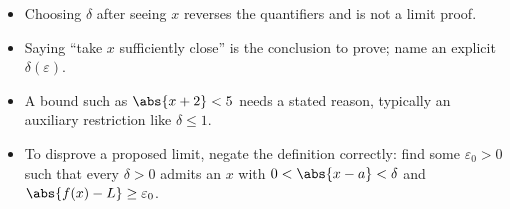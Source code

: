\begin{remark}
\begin{itemize}
  \item Choosing $\delta$ after seeing $x$ reverses the quantifiers and is
  not a limit proof.
  \item Saying ``take $x$ sufficiently close'' is the conclusion to prove;
  name an explicit $\delta(\varepsilon)$.
  \item A bound such as $\abs{x+2}<5$ needs a stated reason, typically an
  auxiliary restriction like $\delta\leq1$.
  \item To disprove a proposed limit, negate the definition correctly:
  find some $\varepsilon_0>0$ such that every $\delta>0$ admits an $x$ with
  $0<\abs{x-a}<\delta$ and $\abs{f(x)-L}\geq\varepsilon_0$.
\end{itemize}
\end{remark}

